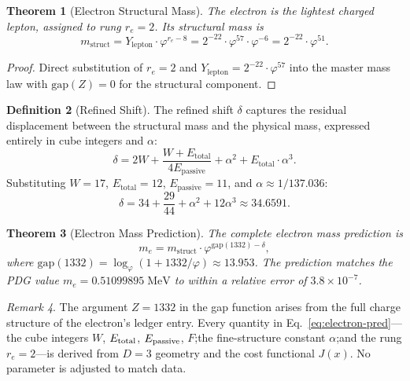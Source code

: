 \documentclass[12pt,a4paper]{article}
\newtheorem{theorem}{Theorem}[section]
\theoremstyle{definition}
\newtheorem{definition}[theorem]{Definition}
\theoremstyle{remark}
\newtheorem{remark}[theorem]{Remark}
\begin{document}
\begin{theorem}[Electron Structural Mass]
\label{thm:struct}
The electron is the lightest charged lepton, assigned to rung
$r_e = 2$.  Its structural mass is
\begin{equation}
  m_{\mathrm{struct}} = Y_{\mathrm{lepton}} \cdot
  \varphi^{r_e - 8} = 2^{-22} \cdot \varphi^{57} \cdot
  \varphi^{-6} = 2^{-22} \cdot \varphi^{51}.
\end{equation}
\end{theorem}

\begin{proof}
Direct substitution of $r_e = 2$ and
$Y_{\mathrm{lepton}} = 2^{-22} \cdot \varphi^{57}$ into the
master mass law with $\mathrm{gap}(Z) = 0$ for the structural
component.
\end{proof}

\begin{definition}[Refined Shift]
\label{def:shift}
The refined shift $\delta$ captures the residual displacement
between the structural mass and the physical mass, expressed
entirely in cube integers and $\alpha$:
\begin{equation}
  \delta = 2W + \frac{W + E_{\mathrm{total}}}
  {4 E_{\mathrm{passive}}} + \alpha^2 +
  E_{\mathrm{total}} \cdot \alpha^3.
  \label{eq:shift}
\end{equation}
Substituting $W = 17$, $E_{\mathrm{total}} = 12$,
$E_{\mathrm{passive}} = 11$, and
$\alpha \approx 1/137.036$:
\begin{equation}
  \delta = 34 + \frac{29}{44} + \alpha^2 + 12\alpha^3
  \approx 34.6591.
\end{equation}
\end{definition}

\begin{theorem}[Electron Mass Prediction]
\label{thm:electron}
The complete electron mass prediction is
\begin{equation}
  \boxed{m_e = m_{\mathrm{struct}} \cdot
  \varphi^{\mathrm{gap}(1332) - \delta}},
  \label{eq:electron-pred}
\end{equation}
where $\mathrm{gap}(1332) = \log_\varphi(1 + 1332/\varphi)
\approx 13.953$.  The prediction matches the PDG value
$m_e = 0.51099895\;\mathrm{MeV}$ to within a relative error
of $3.8 \times 10^{-7}$.
\end{theorem}

\begin{remark}
The argument $Z = 1332$ in the gap function arises from the
full charge structure of the electron's ledger entry.  Every
quantity in Eq.~\eqref{eq:electron-pred}---the cube integers
$W$, $E_{\rm total}$, $E_{\rm passive}$, $F$;\@ the
fine-structure constant $\alpha$;\@ and the rung
$r_e = 2$---is derived from $D = 3$ geometry and the cost
functional $J(x)$.  No parameter is adjusted to match data.
\end{remark}
\end{document}
